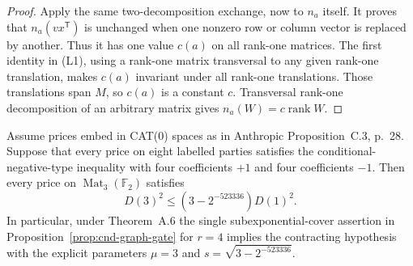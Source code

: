 \begin{proof}
Apply the same two-decomposition exchange, now to $n_a$ itself.
It proves that $n_a(vx^{\mathsf T})$ is unchanged when one
nonzero row or column vector is replaced by another.  Thus it
has one value $c(a)$ on all rank-one matrices.  The first
identity in (L1), using a rank-one matrix transversal to any
given rank-one translation, makes $c(a)$ invariant under all
rank-one translations.  Those translations span $M$, so $c(a)$
is a constant $c$.  Transversal rank-one decomposition of an
arbitrary matrix gives $n_a(W)=c\operatorname{rank}W$.
\end{proof}

\begin{proposition}
\label{prop:cnd-explicit-contraction}
Assume prices embed in CAT(0) spaces as in Anthropic
Proposition~C.3, p.~28.  Suppose that every price on eight
labelled parties satisfies the conditional-negative-type
inequality with four coefficients $+1$ and four coefficients
$-1$.  Then every price on $\operatorname{Mat}_3(\mathbb F_2)$
satisfies
\[
 D(3)^2\le \left(3-2^{-523336}\right)D(1)^2.
\]
In particular, under Theorem~A.6 the single subexponential-cover
assertion in Proposition~\ref{prop:cnd-graph-gate} for $r=4$
implies the contracting hypothesis with the explicit parameters
$\mu=3$ and $s=\sqrt{3-2^{-523336}}$.
\end{proposition}
